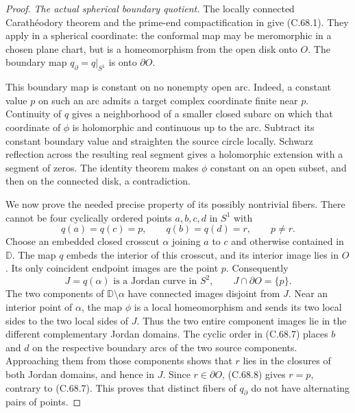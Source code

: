 \begin{proof}
\emph{The actual spherical boundary quotient.}
The locally connected Carath\'eodory theorem and
the prime-end compactification in
\cite[Sections~1 and~3.1]{C_BinderRojasYampolsky2014}
give (C.68.1). They apply in a spherical coordinate:
the conformal map may be meromorphic in a chosen
plane chart, but is a homeomorphism from the open
disk onto $O$. The boundary map
$q_\partial=q|_{S^1}$ is onto $\partial O$.

This boundary map is constant on no nonempty open
arc. Indeed, a constant value $p$ on such an arc
admits a target complex coordinate finite near $p$.
Continuity of $q$ gives a neighborhood of a smaller
closed subarc on which that coordinate of $\phi$
is holomorphic and continuous up to the arc.
Subtract its constant boundary value and straighten
the source circle locally. Schwarz reflection across
the resulting real segment gives a holomorphic
extension with a segment of zeros. The identity
theorem makes $\phi$ constant on an open subset,
and then on the connected disk, a contradiction.

We now prove the needed precise property of its
possibly nontrivial fibers. There cannot be four
cyclically ordered points $a,b,c,d$ in $S^1$ with
\[
            q(a)=q(c)=p,\qquad q(b)=q(d)=r,\qquad p\ne r .
                                                               \tag{C.68.7}
\]
Choose an embedded closed crosscut $\alpha$ joining
$a$ to $c$ and otherwise contained in $\mathbb D$.
The map $q$ embeds the interior of this crosscut,
and its interior image lies in $O$. Its only
coincident endpoint images are the point $p$.
Consequently
\[
           J=q(\alpha)\text{ is a Jordan curve in }S^2,
           \qquad J\cap\partial O=\{p\}.
                                                               \tag{C.68.8}
\]
The two components of $\mathbb D\setminus\alpha$
have connected images disjoint from $J$.
Near an interior point of $\alpha$, the map $\phi$
is a local homeomorphism and sends its two local
sides to the two local sides of $J$.
Thus the two entire component images lie in the
different complementary Jordan domains.
The cyclic order in (C.68.7) places $b$ and $d$
on the respective boundary arcs of the two source
components. Approaching them from those components
shows that $r$ lies in the closures of both
Jordan domains, and hence in $J$.
Since $r\in\partial O$, (C.68.8) gives $r=p$,
contrary to (C.68.7). This proves that distinct
fibers of $q_\partial$ do not have alternating
pairs of points.


\end{proof}
